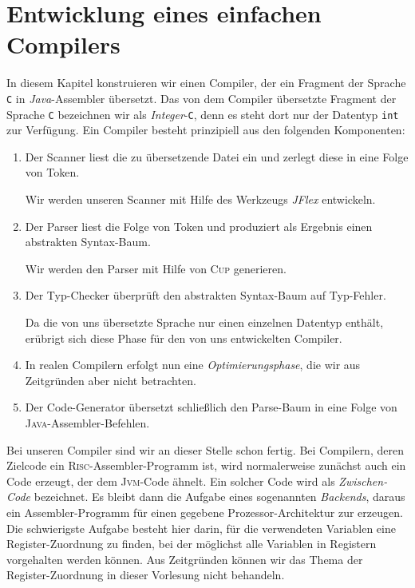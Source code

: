 \chapter{Entwicklung eines einfachen Compilers} 
In diesem Kapitel konstruieren wir einen Compiler, der ein Fragment der Sprache \texttt{C}
in \textsl{Java}-Assembler \"ubersetzt.  
Das von dem Compiler \"ubersetzte Fragment der Sprache \texttt{C} bezeichnen wir als
\textsl{Integer}-\texttt{C}, denn es steht dort nur der Datentyp \texttt{int} zur Verf\"ugung.
Ein Compiler besteht prinzipiell aus den folgenden Komponenten:
\begin{enumerate}
\item Der Scanner liest die zu \"ubersetzende Datei ein und zerlegt diese in eine Folge von Token.
      
      Wir werden unseren Scanner mit Hilfe des Werkzeugs \textsl{JFlex} entwickeln.
\item Der Parser liest die Folge von Token und produziert als Ergebnis einen abstrakten Syntax-Baum.

      Wir werden den Parser mit Hilfe von \textsc{Cup} generieren.
\item Der Typ-Checker \"uberpr\"uft den abstrakten Syntax-Baum auf Typ-Fehler.

      Da die von uns \"ubersetzte Sprache nur einen einzelnen Datentyp enth\"alt, er\"ubrigt
      sich diese Phase f\"ur den von uns entwickelten Compiler.
\item In realen Compilern erfolgt nun eine \emph{Optimierungsphase}, die wir aus Zeitgr\"unden aber nicht betrachten.
\item Der Code-Generator \"ubersetzt schlie{\ss}lich den Parse-Baum in eine Folge von
      \textsc{Java}-Assembler-Befehlen.  
\end{enumerate}
Bei unseren Compiler sind wir an dieser Stelle schon fertig.  Bei Compilern, deren Zielcode ein
\textsc{Risc}-Assembler-Programm ist, wird normalerweise zun\"achst auch ein Code erzeugt, der dem
\textsc{Jvm}-Code \"ahnelt.  Ein solcher Code wird als \emph{Zwischen-Code} bezeichnet.  Es bleibt
dann die Aufgabe eines sogenannten \emph{Backends}, daraus ein Assembler-Programm f\"ur einen gegebene
Prozessor-Architektur zur erzeugen.  Die schwierigste Aufgabe besteht hier darin, f\"ur die
verwendeten Variablen eine Register-Zuordnung zu finden, bei der m\"oglichst alle Variablen in
Registern vorgehalten werden k\"onnen.  
Aus Zeitgr\"unden k\"onnen wir das Thema der Register-Zuordnung in dieser Vorlesung nicht behandeln.

